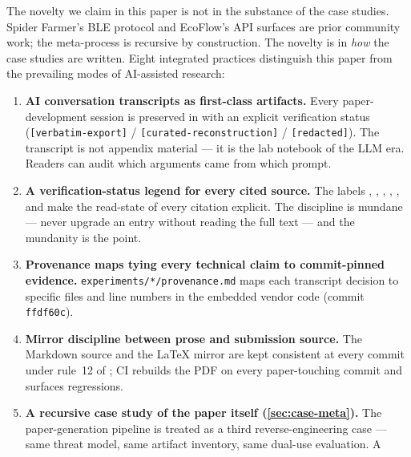 \documentclass[11pt,a4paper]{article}
\begin{document}
The novelty we claim in this paper is not in the substance of the case
studies. Spider Farmer's BLE protocol and EcoFlow's API surfaces are
prior community work; the meta-process is recursive by construction.
The novelty is in \emph{how} the case studies are written. Eight
integrated practices distinguish this paper from the prevailing modes
of AI-assisted research:
\begin{enumerate}
  \item \textbf{AI conversation transcripts as first-class artifacts.}
        Every paper-development session is preserved in
         
        with an explicit verification status
        (\texttt{[verbatim-export]} /
        \texttt{[curated-reconstruction]} / \texttt{[redacted]}). The
        transcript is not appendix material --- it is the lab notebook
        of the LLM era. Readers can audit which arguments came from
        which prompt.
  \item \textbf{A verification-status legend for every cited source.}
        The labels ,
        ,
        ,
        ,
        , and
         make the read-state of
        every citation explicit. The discipline is mundane --- never
        upgrade an entry without reading the full text --- and the
        mundanity is the point.
  \item \textbf{Provenance maps tying every technical claim to
        commit-pinned evidence.}
        \texttt{experiments/*/provenance.md} maps each transcript
        decision to specific files and line numbers in the embedded
        vendor code (commit \texttt{ffdf60c}).
  \item \textbf{Mirror discipline between prose and submission source.}
        The Markdown source  and the
        \LaTeX{} mirror  are kept
        consistent at every commit under rule~12 of
        ; CI rebuilds
        the PDF on every paper-touching commit and surfaces
        regressions.
  \item \textbf{A recursive case study of the paper itself
        (\cref{sec:case-meta}).} The paper-generation pipeline is
        treated as a third reverse-engineering case --- same threat
        model, same artifact inventory, same dual-use evaluation. A

\end{enumerate}
\end{document}

